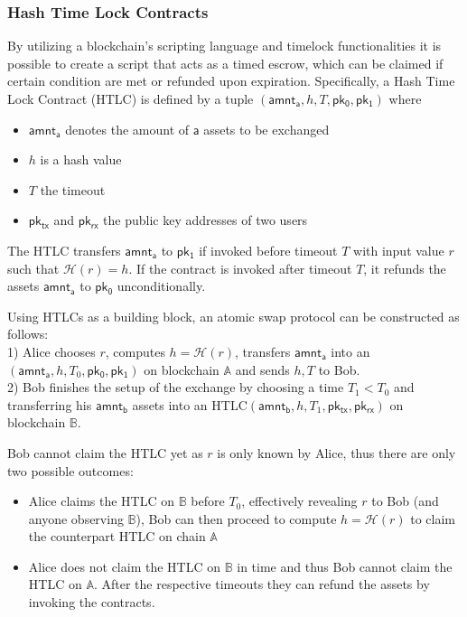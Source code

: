 \documentclass{article}      	%
\begin{document}
\subsubsection{Hash Time Lock Contracts}

By utilizing a blockchain's scripting language and timelock functionalities it is possible to create a script that acts as a timed escrow, which can be claimed if certain condition are met or refunded upon expiration.
Specifically, a Hash Time Lock Contract (HTLC) is defined by a tuple $(\mathsf{amnt_a}, h, T, \mathsf{pk_0}, \mathsf{pk_1})$ where 
\begin{itemize}
	\item $\mathsf{amnt_a}$ denotes the amount of $\mathsf{a}$ assets to be exchanged
	\item $h$ is a hash value
	\item $T$ the timeout
	\item $\mathsf{pk_{tx}}$ and $\mathsf{pk_{rx}}$ the public key addresses of two users
\end{itemize}

The HTLC transfers $\mathsf{amnt_a}$ to $\mathsf{pk_1}$ if invoked before timeout $T$ with input value $r$ such that $\mathcal{H}(r) = h$. 
If the contract is invoked after timeout $T$, it refunds the assets $\mathsf{amnt_a}$ to $\mathsf{pk_0}$ unconditionally.

Using HTLCs as a building block, an atomic swap protocol can be constructed as follows: \\
1) Alice chooses $r$, computes $h = \mathcal{H}(r)$, transfers $\mathsf{amnt_a}$ into an $(\mathsf{amnt_a}, h, T_0, \mathsf{pk_0}, \mathsf{pk_1})$ on blockchain $\mathbb{A}$ and sends $h,T$ to Bob. \\
2) Bob finishes the setup of the exchange by choosing a time $T_1 < T_0$ and transferring his $\mathsf{amnt_b}$ assets into an HTLC$(\mathsf{amnt_b}, h, T_1, \mathsf{pk_{tx}}, \mathsf{pk_{rx}})$ on blockchain $\mathbb{B}$. 

Bob cannot claim the HTLC yet as $r$ is only known by Alice, thus there are only two possible outcomes:
\begin{itemize}
\item Alice claims the HTLC on $\mathbb{B}$ before $T_0$, effectively revealing $r$ to Bob (and anyone observing $\mathbb{B}$), Bob can then proceed to compute $h = \mathcal{H}(r)$ to claim the counterpart HTLC on chain $\mathbb{A}$ 
\item Alice does not claim the HTLC on $\mathbb{B}$ in time and thus Bob cannot claim the HTLC on $\mathbb{A}$. After the respective timeouts they can refund the assets by invoking the contracts.
\end{itemize}
\end{document}
